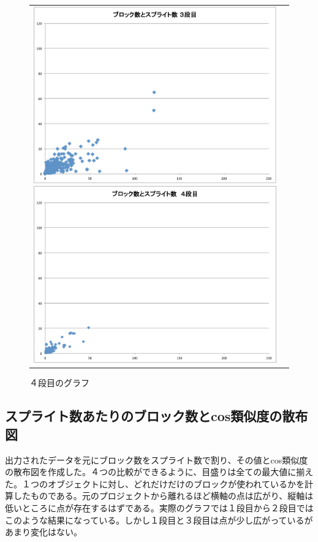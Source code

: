 \documentclass[a4paper,10pt,onecolumn,oneside,openany]{jsbook}
\begin{document}
\begin{figure}[h]
\begin{tabular}{cc}
\begin{minipage}[t]{0.45\hsize}
	 \centering
	 \includegraphics[keepaspectratio, scale = 0.25]{block_splite_3.pdf}
	 \caption{３段目のグラフ}
	 \label{third_block_splite}
	\end{minipage}
        \begin{minipage}[t]{0.45\hsize}
	 \centering
	 \includegraphics[keepaspectratio, scale = 0.25]{block_splite_4.pdf}
	 \caption{４段目のグラフ}
	 \label{fourth_block_splite}
	\end{minipage}
 \end{tabular}
 \end{figure}

\newpage
 \subsection{スプライト数あたりのブロック数とcos類似度の散布図}
出力されたデータを元にブロック数をスプライト数で割り、その値とcos類似度の散布図を作成した。４つの比較ができるように、目盛りは全ての最大値に揃えた。１つのオブジェクトに対し、どれだけだけのブロックが使われているかを計算したものである。元のプロジェクトから離れるほど横軸の点は広がり、縦軸は低いところに点が存在するはずである。実際のグラフでは１段目から２段目ではこのような結果になっている。しかし１段目と３段目は点が少し広がっているがあまり変化はない。
\end{document}
